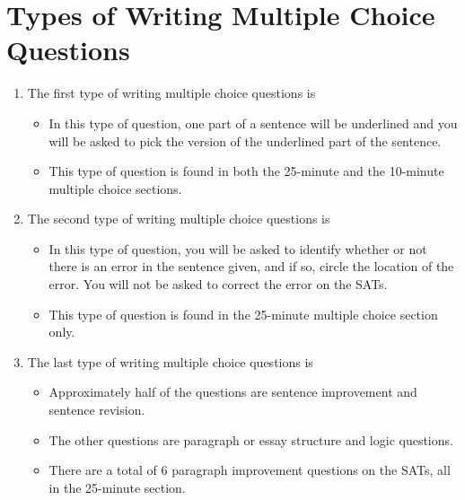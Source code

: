 \section{Types of Writing Multiple Choice Questions}

\begin{enumerate}
\item{The first type of writing multiple choice questions is \hrulefill}
\begin{itemize}
\item{In this type of question, one part of a sentence will be underlined and you will be asked to pick the version of the underlined part of the sentence.}
\item{This type of question is found in both the 25-minute and the 10-minute multiple choice sections.}
\end{itemize}


\item{The second type of writing multiple choice questions is \hrulefill}
\begin{itemize}
\item{In this type of question, you will be asked to identify whether or not there is an error
in the sentence given, and if so, circle the location of the error. You will not be asked
to correct the error on the SATs.}
\item{This type of question is found in the 25-minute multiple choice section only.}
\end{itemize} 

\item{The last type of writing multiple choice questions is \hrulefill}
\begin{itemize}
\item{Approximately half of the questions are sentence improvement and sentence revision.}
\item{The other questions are paragraph or essay structure and logic questions.}
\item{There are a total of 6 paragraph improvement questions on the SATs, all in the 25-minute section.}
\end{itemize}

\end{enumerate}